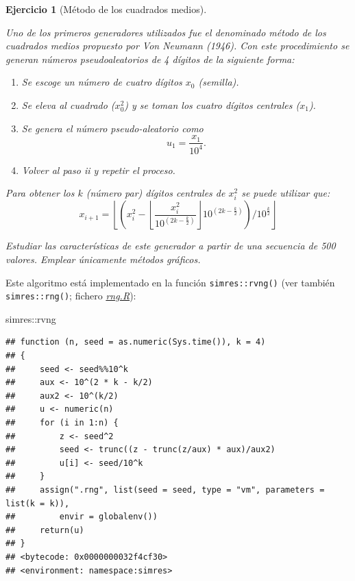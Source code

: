 \documentclass[
]{book}
\newenvironment{Shaded}{\begin{snugshade}}{\end{snugshade}}
\newcommand{\NormalTok}[1]{#1}
\newcommand{\SpecialCharTok}[1]{\textcolor[rgb]{0.00,0.00,0.00}{#1}}
\theoremstyle{break}
\newtheorem{exercise}{Ejercicio}[chapter]
\theoremstyle{nonumberplain}
\begin{document}
\begin{exercise}[Método de los cuadrados medios]
\protect\hypertarget{exr:RANDVN}{}\label{exr:RANDVN}

Uno de los primeros generadores utilizados fue el denominado método de los cuadrados medios propuesto por Von Neumann (1946).
Con este procedimiento se generan números pseudoaleatorios de 4 dígitos de la siguiente forma:

\begin{enumerate}
\def\labelenumi{\roman{enumi}.}
\item
  Se escoge un número de cuatro dígitos \(x_0\) (semilla).
\item
  Se eleva al cuadrado (\(x_0^2\)) y se toman los cuatro dígitos centrales (\(x_1\)).
\item
  Se genera el número pseudo-aleatorio como \[u_1=\frac{x_1}{10^{4}}.\]
\item
  Volver al paso ii y repetir el proceso.
\end{enumerate}

Para obtener los \(k\) (número par) dígitos centrales de \(x_{i}^2\)
se puede utilizar que:
\[x_{i+1}=\left\lfloor \left(  x_{i}^2-\left\lfloor \dfrac{x_{i}^2}{10^{(2k-\frac{k}2)}}\right\rfloor 10^{(2k-\frac{k}2)}\right)
/10^{\frac{k}2}\right\rfloor\]

Estudiar las características de este generador a partir de una secuencia de 500 valores.
Emplear únicamente métodos gráficos.
\end{exercise}

Este algoritmo está implementado en la función \texttt{simres::rvng()} (ver también \texttt{simres::rng()}; fichero \href{R/rng.R}{\emph{rng.R}}):

\begin{Shaded}
\begin{Highlighting}[]
\NormalTok{simres}\SpecialCharTok{::}\NormalTok{rvng}
\end{Highlighting}
\end{Shaded}

\begin{verbatim}
## function (n, seed = as.numeric(Sys.time()), k = 4) 
## {
##     seed <- seed%%10^k
##     aux <- 10^(2 * k - k/2)
##     aux2 <- 10^(k/2)
##     u <- numeric(n)
##     for (i in 1:n) {
##         z <- seed^2
##         seed <- trunc((z - trunc(z/aux) * aux)/aux2)
##         u[i] <- seed/10^k
##     }
##     assign(".rng", list(seed = seed, type = "vm", parameters = list(k = k)), 
##         envir = globalenv())
##     return(u)
## }
## <bytecode: 0x0000000032f4cf30>
## <environment: namespace:simres>
\end{verbatim}
\end{document}
